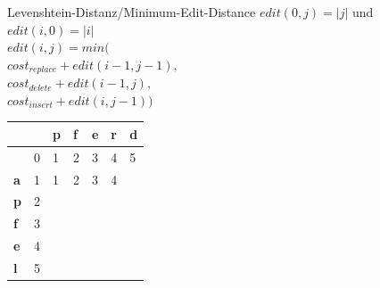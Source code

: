 \documentclass[aspectratio=169]{beamer}
\begin{document}
\begin{frame}[fragile]{Levenshtein-Distanz/Minimum-Edit-Distance}
$edit(0,j)=|j|$ und $edit(i,0)=|i|$\\
$edit(i,j)=min($\\
$cost_{replace} + edit(i-1,j-1),  $\\
$cost_{delete}+ edit(i-1,j),$\\
$cost_{insert}+ edit(i,j-1))  $\\
\begin{table}[]
\begin{tabular}{|l|l|l|l|l|l|l|}
\hline
           & \textbf{} & \textbf{p} & \textbf{f} & \textbf{e} & \textbf{r} & \textbf{d} \\ \hline
\textbf{}  & 0         & 1          & 2          & 3          & 4          & 5          \\ \hline
\textbf{a} & 1         & 1          & 2          & 3          & 4          &            \\ \hline
\textbf{p} & 2         &            &            &            &            &            \\ \hline
\textbf{f} & 3         &            &            &            &            &            \\ \hline
\textbf{e} & 4         &            &            &            &            &            \\ \hline
\textbf{l} & 5         &            &            &            &            &            \\ \hline
\end{tabular}
\end{table}
\end{frame}
\end{document}
